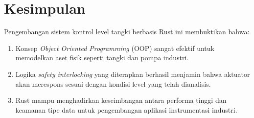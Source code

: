 \documentclass[12pt,a4paper]{article}
\begin{document}
\section{Kesimpulan}
Pengembangan sistem kontrol level tangki berbasis Rust ini membuktikan bahwa:
\begin{enumerate}
    \item Konsep \textit{Object Oriented Programming} (OOP) sangat efektif untuk memodelkan aset fisik seperti tangki dan pompa industri.
    \item Logika \textit{safety interlocking} yang diterapkan berhasil menjamin bahwa aktuator akan merespons sesuai dengan kondisi level yang telah dianalisis.
    \item Rust mampu menghadirkan keseimbangan antara performa tinggi dan keamanan tipe data untuk pengembangan aplikasi instrumentasi industri.
\end{enumerate}
\end{document}
